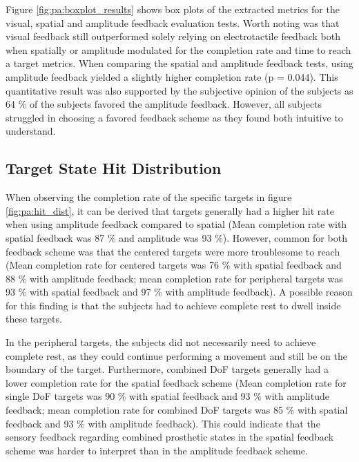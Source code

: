 Figure \ref{fig:pa:boxplot_results} shows box plots of the extracted metrics for the visual, spatial and amplitude feedback evaluation tests. Worth noting was that visual feedback still outperformed solely relying on electrotactile feedback both when spatially or amplitude modulated for the completion rate and time to reach a target metrics. When comparing the spatial and amplitude feedback tests, using amplitude feedback yielded a slightly higher completion rate (p = 0.044). This quantitative result was also supported by the subjective opinion of the subjects as 64 \% of the subjects favored the amplitude feedback. However, all subjects struggled in choosing a favored feedback scheme as they found both intuitive to understand. 


\subsection{Target State Hit Distribution}

When observing the completion rate of the specific targets in figure \ref{fig:pa:hit_dist}, it can be derived that targets generally had a higher hit rate when using amplitude feedback compared to spatial (Mean completion rate with spatial feedback was 87 \% and amplitude was 93 \%). However, common for both feedback scheme was that the centered targets were more troublesome to reach (Mean completion rate for centered targets was 76 \% with spatial feedback and 88 \% with amplitude feedback; mean completion rate for peripheral targets was 93 \% with spatial feedback and 97 \% with amplitude feedback). A possible reason for this finding is that the subjects had to achieve complete rest to dwell inside these targets. 

In the peripheral targets, the subjects did not necessarily need to achieve complete rest, as they could continue performing a movement and still be on the boundary of the target. Furthermore, combined DoF targets generally had a lower completion rate for the spatial feedback scheme (Mean completion rate for single DoF targets was 90 \% with spatial feedback and 93 \% with amplitude feedback; mean completion rate for combined DoF targets was 85 \% with spatial feedback and 93 \% with amplitude feedback). This could indicate that the sensory feedback regarding combined prosthetic states in the spatial feedback scheme was harder to interpret than in the amplitude feedback scheme. 


